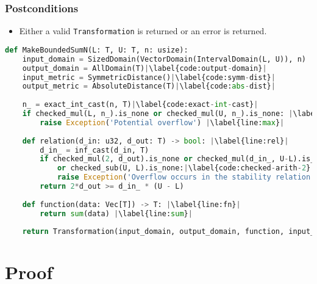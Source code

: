 \documentclass[11pt,a4paper]{article}
\theoremstyle{definition}
\begin{document}
\subsubsection*{Postconditions}
\begin{itemize}
    \item Either a valid \texttt{Transformation} is returned or an error is returned.
\end{itemize}

\begin{lstlisting}[language=Python, escapechar=|]
def MakeBoundedSumN(L: T, U: T, n: usize):
    input_domain = SizedDomain(VectorDomain(IntervalDomain(L, U)), n)
    output_domain = AllDomain(T)|\label{code:output-domain}|
    input_metric = SymmetricDistance()|\label{code:symm-dist}|
    output_metric = AbsoluteDistance(T)|\label{code:abs-dist}|
    
    n_ = exact_int_cast(n, T)|\label{code:exact-int-cast}|
    if checked_mul(L, n_).is_none or checked_mul(U, n_).is_none: |\label{code:no-overflow-sum}|
        raise Exception('Potential overflow') |\label{line:max}|
    
    def relation(d_in: u32, d_out: T) -> bool: |\label{line:rel}|
        d_in_ = inf_cast(d_in, T)
        if checked_mul(2, d_out).is_none or checked_mul(d_in_, U-L).is_none|\label{code:checked-arith-1}|
            or checked_sub(U, L).is_none:|\label{code:checked-arith-2}|
            raise Exception('Overflow occurs in the stability relation')
        return 2*d_out >= d_in_ * (U - L)
    
    def function(data: Vec[T]) -> T: |\label{line:fn}|
        return sum(data) |\label{line:sum}|
    
    return Transformation(input_domain, output_domain, function, input_metric, output_metric, stability_relation = relation)
\end{lstlisting}

\section{Proof}
\end{document}
